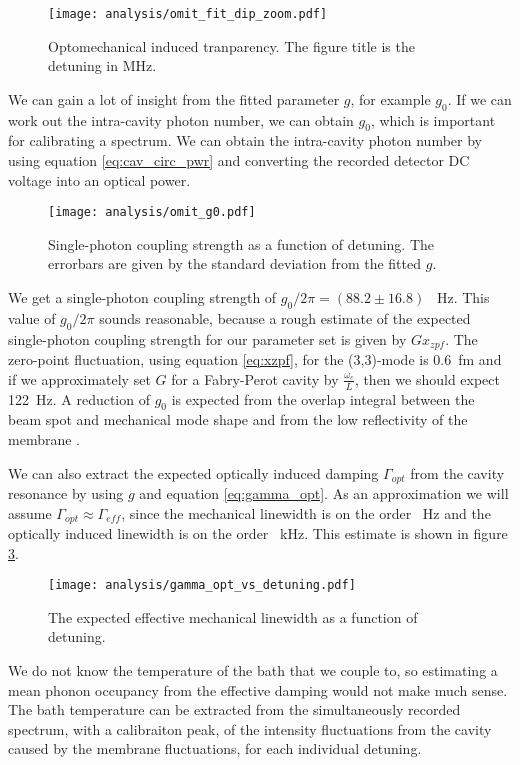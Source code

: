 \begin{figure}[H]
\centering
\texttt{[image: analysis/omit\_fit\_dip\_zoom.pdf]}
\caption{Optomechanical induced tranparency. The figure title is the detuning in MHz.}
\label{fig:omit_g}
\end{figure}

We can gain a lot of insight from the fitted parameter $g$, for example $g_0$. If we can work out the intra-cavity photon number, we can obtain $g_0$, which is important for calibrating a spectrum. We can obtain the intra-cavity photon number by using equation \eqref{eq:cav_circ_pwr} and converting the recorded detector DC voltage into an optical power.

\begin{figure}[H]
\centering
\texttt{[image: analysis/omit\_g0.pdf]}
\caption{Single-photon coupling strength as a function of detuning. The errorbars are given by the standard deviation from the fitted $g$.}
\label{fig:omit_fit_g0}
\end{figure}

We get a single-photon coupling strength of $g_0/2\pi = (88.2 \pm 16.8)$ \SI{}{\hertz}. This value of $g_0/2\pi$ sounds reasonable, because a rough estimate of the expected single-photon coupling strength for our parameter set is given by $Gx_{zpf}$. The zero-point fluctuation, using equation \eqref{eq:xzpf}, for the (3,3)-mode is \SI{0.6}{\femto\meter} and if we approximately set $G$ for a Fabry-Perot cavity by $\frac{\omega_c}{L}$, then we should expect \SI{122}{\hertz}. A reduction of $g_0$ is expected from the overlap integral between the beam spot and mechanical mode shape and from the low reflectivity of the membrane \cite{Wilson2011}.

We can also extract the expected optically induced damping $\Gamma_{opt}$ from the cavity resonance by using $g$ and equation \eqref{eq:gamma_opt}. As an approximation we will assume $\Gamma_{opt} \approx \Gamma_{eff}$, since the mechanical linewidth is on the order \SI{}{\hertz} and the optically induced linewidth is on the order \SI{}{\kilo\hertz}. This estimate is shown in figure \ref{fig:omit_fit_gamma_opt}.

\begin{figure}[H]
\centering
\texttt{[image: analysis/gamma\_opt\_vs\_detuning.pdf]}
\caption{The expected effective mechanical linewidth as a function of detuning.}
\label{fig:omit_fit_gamma_opt}
\end{figure}

We do not know the temperature of the bath that we couple to, so estimating a mean phonon occupancy from the effective damping would not make much sense. The bath temperature can be extracted from the simultaneously recorded spectrum, with a calibraiton peak, of the intensity fluctuations from the cavity caused by the membrane fluctuations, for each individual detuning.